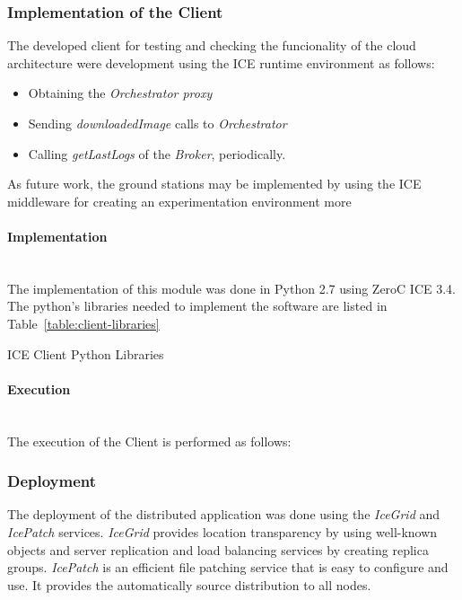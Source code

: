 \subsubsection{Implementation of the Client}

The developed client for testing and checking the funcionality of the cloud
architecture were development using the ICE runtime environment as follows:
\begin{itemize}
\item Obtaining the \emph{Orchestrator proxy}
\item Sending \emph{downloadedImage} calls to \emph{Orchestrator}
\item Calling \emph{getLastLogs} of the \emph{Broker}, periodically.
\end{itemize}

As future work, the ground stations may be implemented by using the ICE
middleware for creating an experimentation environment more 
\paragraph{Implementation}~\\

The implementation of this module was done in Python 2.7 using ZeroC ICE 3.4. The
python's libraries needed to implement the software are listed in
Table~\ref{table:client-libraries}

\begin{table}[hp]
  \centering
  {\small
  
  }
  \caption{ICE Client Python Libraries}
  \label{table:client-libraries}
\end{table}

\paragraph{Execution}~\\


The execution of the Client is performed as follows:


\subsubsection{Deployment}
\label{subsub:deployment}

The deployment of the distributed application was done using the \emph{IceGrid}
and \emph{IcePatch} services. 
\emph{IceGrid} provides location transparency by using well-known objects and server replication and load
balancing services by creating replica groups. \emph{IcePatch} is an
efficient file patching service that is easy to configure and use. It provides the
automatically source distribution to all nodes.

